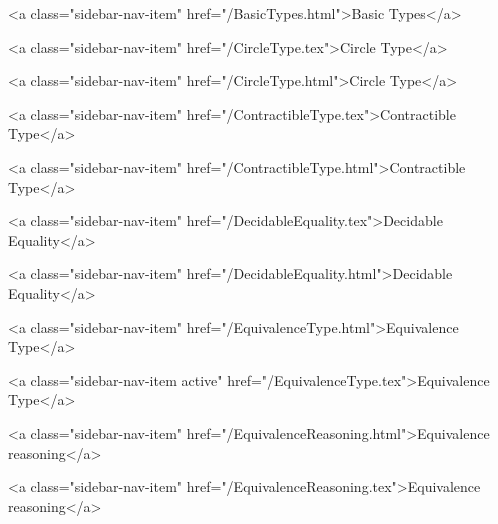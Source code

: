       
    
      
        
          <a class="sidebar-nav-item" href="/BasicTypes.html">Basic Types</a>
        
      
    
      
        
          <a class="sidebar-nav-item" href="/CircleType.tex">Circle Type</a>
        
      
    
      
        
          <a class="sidebar-nav-item" href="/CircleType.html">Circle Type</a>
        
      
    
      
        
          <a class="sidebar-nav-item" href="/ContractibleType.tex">Contractible Type</a>
        
      
    
      
        
          <a class="sidebar-nav-item" href="/ContractibleType.html">Contractible Type</a>
        
      
    
      
        
          <a class="sidebar-nav-item" href="/DecidableEquality.tex">Decidable Equality</a>
        
      
    
      
        
          <a class="sidebar-nav-item" href="/DecidableEquality.html">Decidable Equality</a>
        
      
    
      
        
          <a class="sidebar-nav-item" href="/EquivalenceType.html">Equivalence Type</a>
        
      
    
      
        
          <a class="sidebar-nav-item active" href="/EquivalenceType.tex">Equivalence Type</a>
        
      
    
      
        
          <a class="sidebar-nav-item" href="/EquivalenceReasoning.html">Equivalence reasoning</a>
        
      
    
      
        
          <a class="sidebar-nav-item" href="/EquivalenceReasoning.tex">Equivalence reasoning</a>
        
